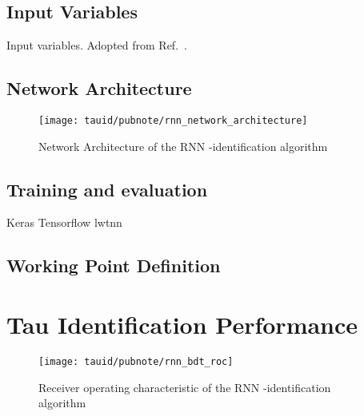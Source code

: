 \subsection{Input Variables}

\begin{table}[htbp]
  \centering

  \caption{Input variables. Adopted from
    Ref.~\cite{ATL-PHYS-PUB-2019-033}.}%
  \label{tab:tauid_input_variables}

  
\end{table}

\subsection{Network Architecture}

\begin{figure}[htbp]
  \centering

  \texttt{[image: tauid/pubnote/rnn\_network\_architecture]}

  \caption{Network Architecture of the RNN \tauhad-identification
    algorithm \cite{ATL-PHYS-PUB-2019-033}}
  \label{fig:tauid_network_architecture}
\end{figure}

\subsection{Training and evaluation}

Keras Tensorflow lwtnn \cite{lwtnn,keras,tensorflow2015-whitepaper,lstm}


\subsection{Working Point Definition}


\section{Tau Identification Performance}

\begin{figure}[htbp]
  \centering

  \texttt{[image: tauid/pubnote/rnn\_bdt\_roc]}

  \caption{Receiver operating characteristic of the RNN
    \tauhad-identification algorithm \cite{ATL-PHYS-PUB-2019-033}}
  \label{fig:tauid_rnn_bdt_roc_comparison}
\end{figure}


